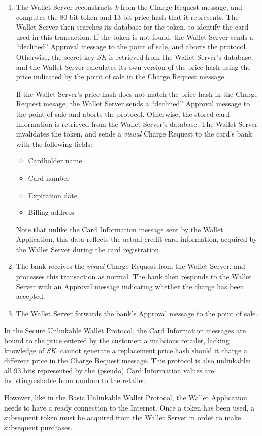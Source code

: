 \begin{enumerate}
\item The Wallet Server reconstructs \emph{k} from the Charge Request message, and computes the 80-bit token and 13-bit price hash that it represents.
    The Wallet Server then searches its database for the token, to identify the card used in this transaction.
    If the token is not found, the Wallet Server sends a ``declined'' Approval message to the point of sale, and aborts the protocol.
    Otherwise, the secret key \emph{SK} is retrieved from the Wallet Server's database, and the Wallet Server calculates its own version of the price hash
        using the price indicated by the point of sale in the Charge Request message.

    If the Wallet Server's price hash does not match the price hash in the Charge Request mesage,
        the Wallet Server sends a ``declined'' Approval message to the point of sale and aborts the protocol.
    Otherwise, the stored card information is retrieved from the Wallet Server's database.
    The Wallet Server invalidates the token, and sends a \emph{visual} Charge Request to the card's bank with the following fields:
    \begin{itemize}
    \item Cardholder name
    \item Card number
    \item Expiration date
    \item Billing address
    \end{itemize}
    Note that unlike the Card Information message sent by the Wallet Application, this data reflects the actual credit card information,
        acquired by the Wallet Server during the card registration.

\item The bank receives the \emph{visual} Charge Request from the Wallet Server, and processes this transaction as normal.
    The bank then responds to the Wallet Server with an Approval message indicating whether the charge has been accepted.

\item The Wallet Server forwards the bank's Approval message to the point of sale.
\end{enumerate}

In the Secure Unlinkable Wallet Protocol, the Card Information messages are bound to the price entered by the customer:
    a malicious retailer, lacking knowledge of \emph{SK}, cannot generate a replacement price hash should it charge a different price in the Charge Request message.
This protocol is also unlinkable: all 93 bits represented by the (pseudo) Card Information values are indistinguishable from random to the retailer.

However, like in the Basic Unlinkable Wallet Protocol, the Wallet Application needs to have a ready connection to the Internet.
Once a token has been used, a subsequent token must be acquired from the Wallet Server in order to make subsequent purchases.